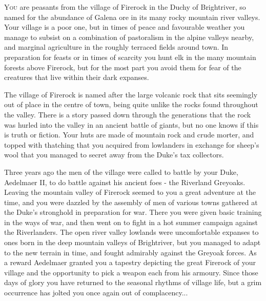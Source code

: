 \documentclass[paper=a4, fontsize=11pt]{scrartcl} %
\begin{document}
\begin{multicols}{2} %

\lettrine[lines=3]{\medievalsharp Y}{ou} are peasants from the village of Firerock in the Duchy of Brightriver, so named for the abundance of Galena ore in its many rocky mountain river valleys. Your village is a poor one, but in times of peace and favourable weather you manage to subsist on a combination of pastoralism in the alpine valleys nearby, and marginal agriculture in the roughly terraced fields around town. In preparation for feasts or in times of scarcity you hunt elk in the many mountain forests above Firerock, but for the most part you avoid them for fear of the creatures that live within their dark expanses.

The village of Firerock is named after the large volcanic rock that sits seemingly out of place in the centre of town, being quite unlike the rocks found throughout the valley. There is a story passed down through the generations that the rock was hurled into the valley in an ancient battle of giants, but no one knows if this is truth or fiction. Your huts are made of mountain rock and crude morter, and topped with thatching that you acquired from lowlanders in exchange for sheep's wool that you managed to secret away from the Duke's tax collectors. 

Three years ago the men of the village were called to battle by your Duke, Aedelmaer II, to do battle against his ancient foes - the Riverland Greyoaks. Leaving the mountain valley of Firerock seemed to you a great adventure at the time, and you were dazzled by the assembly of men of various towns gathered at the Duke's stronghold in preparation for war. There you were given basic training in the ways of war, and then went on to fight in a hot summer campaign against the Riverlanders. The open river valley lowlands were uncomfortable expanses to ones born in the deep mountain valleys of Brightriver, but you managed to adapt to the new terrain in time, and fought admirably against the Greyoak forces. As a reward Aedelmaer granted you a tapestry depicting the great Firerock of your village and the opportunity to pick a weapon each from his armoury. Since those days of glory you have returned to the seasonal rhythms of village life, but a grim occurrence has jolted you once again out of complacency...

\end{multicols}

\pagebreak
\end{document}
